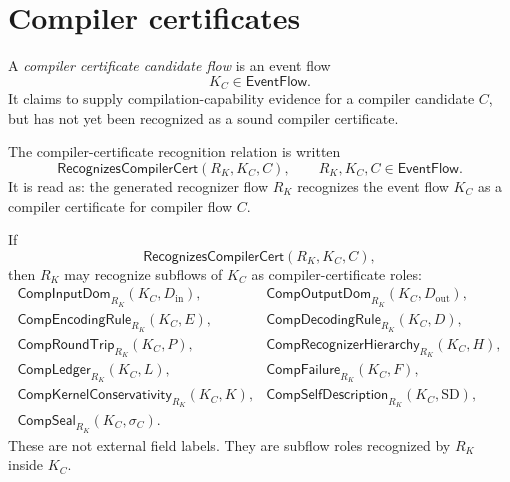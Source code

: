 \section{Compiler certificates}
\label{sec:self-hosting-compiler-certificates}

\begin{definition}
\label{def:self-hosting-compiler-cert-candidate}
A \emph{compiler certificate candidate flow} is an event flow
$$
  K_C\in\mathsf{EventFlow}.
$$
It claims to supply compilation-capability evidence for a compiler candidate $C$, but has not yet been recognized as a sound compiler certificate.
\end{definition}

\begin{definition}
\label{def:self-hosting-compiler-cert-recognition}
The compiler-certificate recognition relation is written
$$
  \mathsf{RecognizesCompilerCert}(R_K,K_C,C),
  \qquad
  R_K,K_C,C\in\mathsf{EventFlow}.
$$
It is read as: the generated recognizer flow $R_K$ recognizes the event flow $K_C$ as a compiler certificate for compiler flow $C$.
\end{definition}

\begin{definition}
\label{def:self-hosting-compiler-certificate-fields}
If
$$
  \mathsf{RecognizesCompilerCert}(R_K,K_C,C),
$$
then $R_K$ may recognize subflows of $K_C$ as compiler-certificate roles:
$$
\begin{array}{ll}
  \mathsf{CompInputDom}_{R_K}(K_C,D_{\mathrm{in}}),&
  \mathsf{CompOutputDom}_{R_K}(K_C,D_{\mathrm{out}}),\\
  \mathsf{CompEncodingRule}_{R_K}(K_C,E),&
  \mathsf{CompDecodingRule}_{R_K}(K_C,D),\\
  \mathsf{CompRoundTrip}_{R_K}(K_C,P),&
  \mathsf{CompRecognizerHierarchy}_{R_K}(K_C,H),\\
  \mathsf{CompLedger}_{R_K}(K_C,L),&
  \mathsf{CompFailure}_{R_K}(K_C,F),\\
  \mathsf{CompKernelConservativity}_{R_K}(K_C,K),&
  \mathsf{CompSelfDescription}_{R_K}(K_C,\mathrm{SD}),\\
  \mathsf{CompSeal}_{R_K}(K_C,\sigma_C).
\end{array}
$$
These are not external field labels. They are subflow roles recognized by $R_K$ inside $K_C$.
\end{definition}

